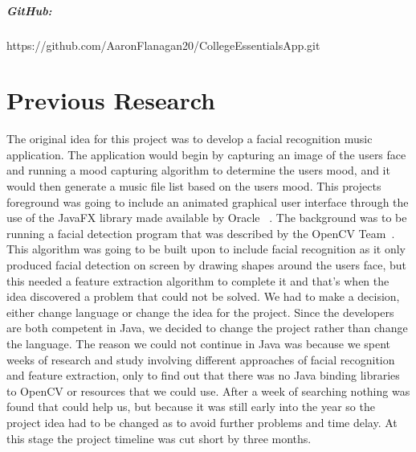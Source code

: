\paragraph{GitHub:} https://github.com/AaronFlanagan20/CollegeEssentialsApp.git

\chapter*{Previous Research}
The original idea for this project was to develop a facial recognition music application. The application would begin by capturing an image of the users face and running a mood capturing algorithm to determine the users mood, and it would then generate a music file list based on the users mood. This projects foreground was going to include an animated graphical user interface through the use of the JavaFX library made available by Oracle ~\cite{javafx}. The background was to be running a facial detection program that was described by the OpenCV Team~\cite{opencv}. This algorithm was going to be built upon to include facial recognition as it only produced facial detection on screen by drawing shapes around the users face, but this needed a feature extraction algorithm to complete it and that's when the idea discovered a problem that could not be solved. We had to make a decision, either change language or change the idea for the project. Since the developers are both competent in Java, we decided to change the project rather than change the language. The reason we could not continue in Java was because we spent weeks of research and study involving different approaches of facial recognition and feature extraction, only to find out that there was no Java binding libraries to OpenCV or resources that we could use. After a week of searching nothing was found that could help us, but because it was still early into the year so the project idea had to be changed as to avoid further problems and time delay. At this stage the project timeline was cut short by three months.

